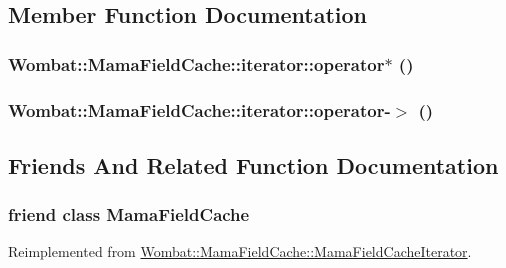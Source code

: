 \subsection{Member Function Documentation}
\hypertarget{classWombat_1_1MamaFieldCache_1_1iterator_a2a6be876ff87f60e4cae78a723098168}{
\subsubsection[{operator$\ast$}]{ Wombat::MamaFieldCache::iterator::operator$\ast$ ()}}
\label{classWombat_1_1MamaFieldCache_1_1iterator_a2a6be876ff87f60e4cae78a723098168}
\hypertarget{classWombat_1_1MamaFieldCache_1_1iterator_a4ddc67c54b011ff994bdee9442e640a6}{
\subsubsection[{operator-\/$>$}]{ Wombat::MamaFieldCache::iterator::operator-\/$>$ ()}}
\label{classWombat_1_1MamaFieldCache_1_1iterator_a4ddc67c54b011ff994bdee9442e640a6}


\subsection{Friends And Related Function Documentation}
\hypertarget{classWombat_1_1MamaFieldCache_1_1iterator_a6a1b5aceea64638fc294b40bdb9251fb}{
\subsubsection[{MamaFieldCache}]{\setlength{\rightskip}{0pt plus 5cm}friend class {\bf MamaFieldCache}}}
\label{classWombat_1_1MamaFieldCache_1_1iterator_a6a1b5aceea64638fc294b40bdb9251fb}


Reimplemented from \hyperlink{classWombat_1_1MamaFieldCache_1_1MamaFieldCacheIterator_a6a1b5aceea64638fc294b40bdb9251fb}{Wombat::MamaFieldCache::MamaFieldCacheIterator}.